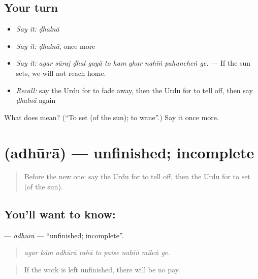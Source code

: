 \subsection*{Your turn}
\begin{itemize}
\raggedright
  \item \emph{Say it:} \emph{ḍhalnā}
  \item \emph{Say it:} \emph{ḍhalnā}, once more
  \item \emph{Say it:} \emph{agar sūraj ḍhal gayā to ham ghar nahīṅ pahuncheṅ ge.} — If the sun sets, we will not reach home.
  \item \emph{Recall:} say the Urdu for to fade away, then the Urdu for to tell off, then say \emph{ḍhalnā} again
\end{itemize}

\begin{tcolorbox}[breakable,colback=teal!4,colframe=teal!35!black,title={Before you move on}]
What does  mean? (\textquotedblleft{}To set (of the sun); to wane\textquotedblright{}.) Say it once more.
\end{tcolorbox}
\section[\texorpdfstring{\ur{ادھورا} (adhūrā)}{ادھورا (adhūrā)}]{ (adhūrā) — unfinished; incomplete}

\label{lesson:UR-C373-adhura}



\begin{quote}
Before the new one: say the Urdu for to tell off, then the Urdu for to set (of the sun).
\end{quote}

\subsection*{You'll want to know: }
\textbf{} — \emph{adhūrā} — \textquotedblleft{}unfinished; incomplete\textquotedblright{}.

\begin{quote}
        
\end{quote}

\begin{quote}
\emph{agar kām adhūrā rahā to paise nahīṅ mileṅ ge.}
\end{quote}

\begin{quote}
If the work is left unfinished, there will be no pay.
\end{quote}


